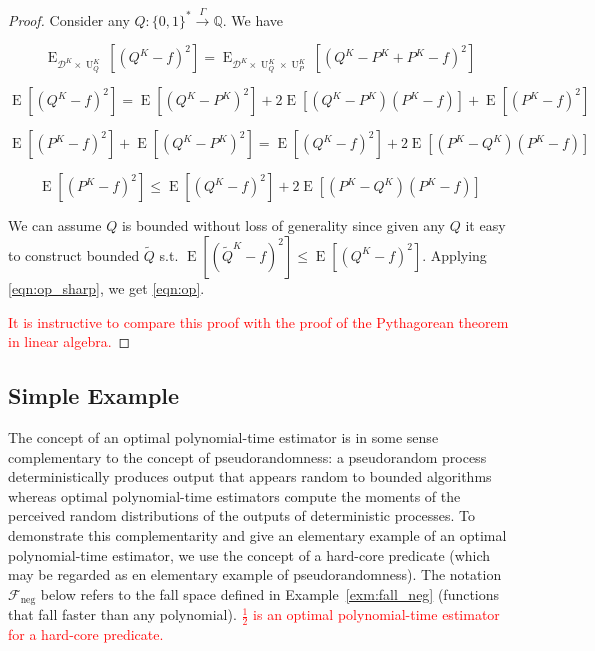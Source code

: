\documentclass[11pt]{article}
\numberwithin{equation}{section}
\theoremstyle{definition}
\theoremstyle{plain}
\newcommand{\Bool}{\{0,1\}}
\newcommand{\Words}{{\Bool^*}}
\DeclareMathOperator{\E}{E}
\DeclareMathOperator{\Un}{U}
\newcommand{\Rats}{\mathbb{Q}}
\newcommand{\Dist}{\mathcal{D}}
\newcommand{\Fall}{\mathcal{F}}
\newcommand{\Scheme}{\xrightarrow{\Gamma}}
\begin{document}
\begin{proof}

Consider any $Q: \Words \Scheme \Rats$. We have

$$\E_{\Dist^{K} \times \Un_Q^{K}}[(Q^{K}-f)^2]=\E_{\Dist^{K} \times \Un_Q^{K} \times \Un_P^{K}}[(Q^{K}-P^{K}+P^{K}-f)^2]$$

$$\E[(Q^{K}-f)^2]=\E[(Q^{K}-P^{K})^2]+2\E[(Q^{K}-P^{K})(P^{K}-f)]+\E[(P^{K}-f)^2]$$

$$\E[(P^{K}-f)^2]+\E[(Q^{K}-P^{K})^2]=\E[(Q^{K}-f)^2]+2\E[(P^{K}-Q^{K})(P^{K}-f)]$$

$$\E[(P^{K}-f)^2] \leq \E[(Q^{K}-f)^2] + 2\E[(P^{K}-Q^{K})(P^{K}-f)]$$

We can assume $Q$ is bounded without loss of generality since given any $Q$ it easy to construct bounded $\tilde{Q}$ s.t. $\E[(\tilde{Q}^{K}-f)^2] \leq \E[(Q^{K}-f)^2]$. Applying \ref{eqn:op_sharp}, we get \ref{eqn:op}.

\textcolor{red}{It is instructive to compare this proof with the proof of the Pythagorean theorem in linear algebra.}
\end{proof}

\subsection{Simple Example}
\label{sec:fundamentals__one_way}

The concept of an optimal polynomial-time estimator is in some sense complementary to the concept of pseudorandomness: a pseudorandom process deterministically produces output that appears random to bounded algorithms whereas optimal polynomial-time estimators compute the moments of the perceived random distributions of the outputs of deterministic processes. To demonstrate this complementarity and give an elementary example of an optimal polynomial-time estimator, we use the concept of a hard-core predicate (which may be regarded as en elementary example of pseudorandomness). The notation $\Fall_\text{neg}$ below refers to the fall space defined in Example~\ref{exm:fall_neg} (functions that fall faster than any polynomial). \textcolor{red}{$\frac{1}{2}$ is an optimal polynomial-time estimator for a hard-core predicate.}
\end{document}

